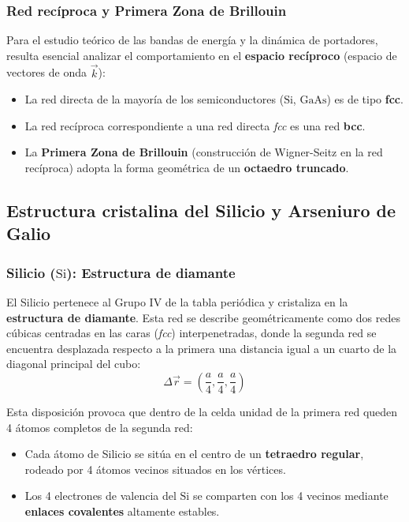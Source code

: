 \subsubsection{Red recíproca y Primera Zona de Brillouin}
Para el estudio teórico de las bandas de energía y la dinámica de portadores, resulta esencial analizar el comportamiento en el \textbf{espacio recíproco} (espacio de vectores de onda $\vec{k}$):
\begin{itemize}
    \item La red directa de la mayoría de los semiconductores ($\text{Si}$, $\text{GaAs}$) es de tipo \textbf{fcc}.
    \item La red recíproca correspondiente a una red directa \textit{fcc} es una red \textbf{bcc}.
    \item La \textbf{Primera Zona de Brillouin} (construcción de Wigner-Seitz en la red recíproca) adopta la forma geométrica de un \textbf{octaedro truncado}.
\end{itemize}

\subsection{Estructura cristalina del Silicio y Arseniuro de Galio}

\subsubsection{Silicio ($\text{Si}$): Estructura de diamante}
El Silicio pertenece al Grupo IV de la tabla periódica y cristaliza en la \textbf{estructura de diamante}. Esta red se describe geométricamente como dos redes cúbicas centradas en las caras (\textit{fcc}) interpenetradas, donde la segunda red se encuentra desplazada respecto a la primera una distancia igual a un cuarto de la diagonal principal del cubo:
\[
\Delta \vec{r} = \left( \frac{a}{4}, \frac{a}{4}, \frac{a}{4} \right)
\]

Esta disposición provoca que dentro de la celda unidad de la primera red queden 4 átomos completos de la segunda red:
\begin{itemize}
    \item Cada átomo de Silicio se sitúa en el centro de un \textbf{tetraedro regular}, rodeado por 4 átomos vecinos situados en los vértices.
    \item Los 4 electrones de valencia del $\text{Si}$ se comparten con los 4 vecinos mediante \textbf{enlaces covalentes} altamente estables.
\end{itemize}

